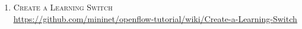 	\begin{enumerate}
		\item \textsc{Create a Learning Switch}\\
		\underline{\url{https://github.com/mininet/openflow-tutorial/wiki/Create-a-Learning-Switch}}
	\end{enumerate}
\newpage
